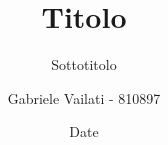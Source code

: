\documentclass[italian]{beamer}
\title{Titolo}
\subtitle{Sottotitolo}
\author{Gabriele Vailati - 810897}
\date{Date}
\institute{Università degli Studi di Milano}
\begin{document}
\begin{frame}[plain]
\titlepage
\end{frame}
\end{document}
